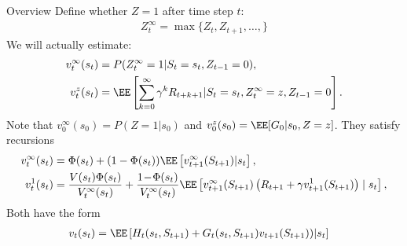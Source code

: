 \begin{frame}{Overview}
Define whether $Z=1$ after time step $t$:
\begin{align*}
	Z_t^\infty = \max\{Z_t,Z_{t+1}, \dots,\} %
\end{align*}  \pause
We will actually estimate:
\begin{align*}
	v^{\infty}_t(s_t) & = P(Z^\infty_t =1 | S_t=s_t, Z_{t-1} = 0), \\
	v^{z}_t(s_t) & = \EE\left[\sum_{k=0}^\infty \gamma^{k}R_{t+k+1} | S_t=s_t, Z_t^\infty = z, Z_{t-1} = 0\right].  %
\end{align*}
Note that $v^\infty_0(s_0) = P(Z = 1| s_0)$ and $v^z_0(s_0) = \EE[G_0 | s_0, Z=z]$. \pause
They satisfy recursions
\begin{subequations} 
\begin{align*}
		v^\infty_t(s_t) & = \Phi(s_t) + (1-\Phi(s_t) ) \EE\left[ v^\infty_{t+1}(S_{t+1} )| s_t\right],  \\ 
		v^{1}_t(s_t) & =  \frac{ V(s_t) \Phi(s_t) }{V_t^\infty(s_t) }  
		+ \frac{  1\!-\! \Phi(s_t)  }{V_t^\infty(s_t) } \EE\left[ v^\infty_{t+1}(S_{t+1}) \left( R_{t+1} + \gamma v^{1}_{t+1}(S_{t+1} ) \right) \mid s_t   \right], \nonumber \\	
\end{align*}
\end{subequations}
Both have the form
\begin{align*}
	v_t(s_t) & =\EE\left[H_t(s_t,S_{t+1})  + G_t(s_t, S_{t+1}) v_{t+1}(S_{t+1} )  )  \middle| s_t\right] %
\end{align*}\end{frame}
